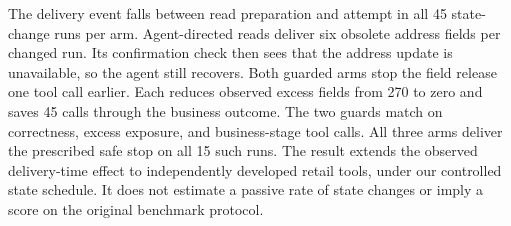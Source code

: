 The delivery event falls between read preparation and attempt in all 45 state-change runs per arm. Agent-directed reads deliver six obsolete address fields per changed run. Its confirmation check then sees that the address update is unavailable, so the agent still recovers. Both guarded arms stop the field release one tool call earlier. Each reduces observed excess fields from 270 to zero and saves 45 calls through the business outcome. The two guards match on correctness, excess exposure, and business-stage tool calls. All three arms deliver the prescribed safe stop on all 15 such runs. The result extends the observed delivery-time effect to independently developed retail tools, under our controlled state schedule. It does not estimate a passive rate of state changes or imply a score on the original benchmark protocol.
